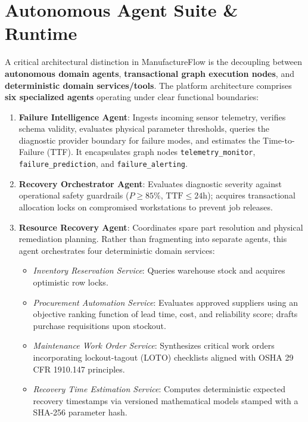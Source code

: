\documentclass[10pt,twocolumn,a4paper]{article}
\begin{document}
\section{Autonomous Agent Suite \& Runtime}
\label{sec:agents}
A critical architectural distinction in ManufactureFlow is the decoupling between \textbf{autonomous domain agents}, \textbf{transactional graph execution nodes}, and \textbf{deterministic domain services/tools}. The platform architecture comprises \textbf{six specialized agents} operating under clear functional boundaries:

\begin{enumerate}
    \item \textbf{Failure Intelligence Agent}: Ingests incoming sensor telemetry, verifies schema validity, evaluates physical parameter thresholds, queries the diagnostic provider boundary for failure modes, and estimates the Time-to-Failure (TTF). It encapsulates graph nodes \texttt{telemetry\_monitor}, \texttt{failure\_prediction}, and \texttt{failure\_alerting}.
    \item \textbf{Recovery Orchestrator Agent}: Evaluates diagnostic severity against operational safety guardrails ($P \ge 85\%$, $\text{TTF} \le 24\text{h}$); acquires transactional allocation locks on compromised workstations to prevent job releases.
    \item \textbf{Resource Recovery Agent}: Coordinates spare part resolution and physical remediation planning. Rather than fragmenting into separate agents, this agent orchestrates four deterministic domain services:
    \begin{itemize}
        \item \textit{Inventory Reservation Service}: Queries warehouse stock and acquires optimistic row locks.
        \item \textit{Procurement Automation Service}: Evaluates approved suppliers using an objective ranking function of lead time, cost, and reliability score; drafts purchase requisitions upon stockout.
        \item \textit{Maintenance Work Order Service}: Synthesizes critical work orders incorporating lockout-tagout (LOTO) checklists aligned with OSHA 29 CFR 1910.147 principles.
        \item \textit{Recovery Time Estimation Service}: Computes deterministic expected recovery timestamps via versioned mathematical models stamped with a SHA-256 parameter hash.

\end{itemize}
\end{enumerate}
\end{document}
